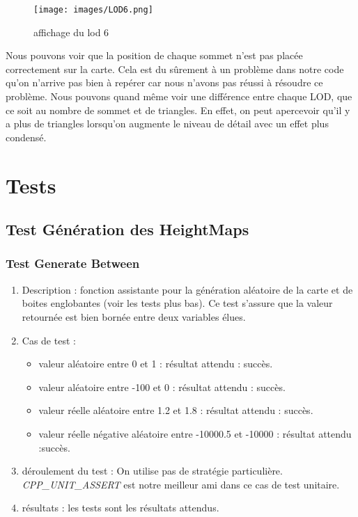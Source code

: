 \documentclass[12pt]{report}
\begin{document}
\begin{figure}[h]
            \centering
            \texttt{[image: images/LOD6.png]}
            \caption{affichage du lod 6}
        \end{figure}
\newpage

Nous pouvons voir que la position de chaque sommet n'est pas placée correctement sur la carte. Cela est du sûrement à un problème dans notre code qu'on n'arrive pas bien à repérer car nous n'avons pas réussi à résoudre ce problème. Nous pouvons quand même voir une différence entre chaque LOD, que ce soit au nombre de sommet et de triangles. En effet, on peut apercevoir qu'il y a plus de triangles lorsqu'on augmente le niveau de détail avec un effet plus condensé. 

\chapter{Tests}

\section{Test Génération des HeightMaps}

\subsection{Test Generate Between}
\begin{enumerate}
    \item Description : fonction assistante pour la génération aléatoire de la carte et de boites englobantes (voir les tests plus bas). Ce test s'assure que la valeur retournée est bien bornée entre deux variables élues.
    \item Cas de test :
    \begin{itemize}
        \item valeur aléatoire entre 0 et 1 : résultat attendu : succès.
        \item valeur aléatoire entre -100 et 0 : résultat attendu : succès.
        \item valeur réelle aléatoire entre 1.2 et 1.8 : résultat attendu : succès.
        \item valeur réelle négative aléatoire entre -10000.5 et -10000 : résultat attendu :succès.
    \end{itemize}
    \item déroulement du test : On utilise pas de stratégie particulière. 
    \emph{CPP\_UNIT\_ASSERT} est notre meilleur ami dans ce cas de test unitaire.
    \item résultats : les tests sont les résultats attendus.
\end{enumerate}
\end{document}

